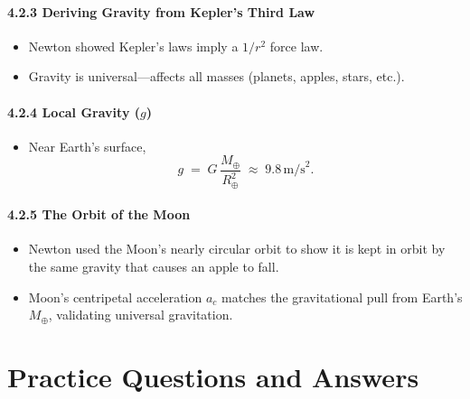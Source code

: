 \paragraph{4.2.3 Deriving Gravity from Kepler’s Third Law}
\begin{itemize}
  \item Newton showed Kepler’s laws imply a $1/r^2$ force law.
  \item Gravity is universal---affects all masses (planets, apples, stars, etc.).
\end{itemize}

\paragraph{4.2.4 Local Gravity ($g$)}
\begin{itemize}
  \item Near Earth’s surface,
  \[
    g \;=\; G\,\frac{M_{\oplus}}{R_{\oplus}^2} \;\approx\; 9.8\,\text{m/s}^2.
  \]
\end{itemize}

\paragraph{4.2.5 The Orbit of the Moon}
\begin{itemize}
  \item Newton used the Moon’s nearly circular orbit to show it is kept in orbit by the same gravity that causes an apple to fall.
  \item Moon’s centripetal acceleration $a_c$ matches the gravitational pull from Earth’s $M_{\oplus}$, validating universal gravitation.
\end{itemize}

\section{Practice Questions and Answers}

